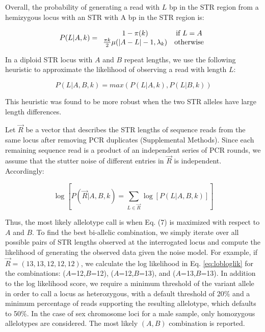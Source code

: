 {Overall, the probability of generating a read with $L$ bp in the STR region from a hemizygous locus with an STR with A bp in the STR region is:

\begin{equation}
P(L|A, k) = 
\begin{array}{c c}
1-\pi(k) & \text{if } L=A \\
\frac{\pi{k}}{2} \mu(|A-L|-1, \lambda_k) & \text{otherwise} \\
\end{array}
\end{equation}

In a diploid STR locus with $A$ and $B$ repeat lengths, we use the following heuristic to approximate the likelihood of observing a read with length $L$:

\begin{equation}
P(L|A,B,k) = max(P(L|A,k),P(L|B,k))
\end{equation}

This heuristic was found to be more robust when the two STR alleles have large length differences.

Let $\vec{R}$ be a vector that describes the STR lengths of sequence reads from the same locus after removing PCR duplicates (Supplemental Methods). Since each remaining sequence read is a product of an independent series of PCR rounds, we assume that the stutter noise of different entries in $\vec{R}$ is independent. Accordingly: 

\begin{equation} \label{eq:lobloglik}
\log[P(\vec{R}|A,B,k) = \sum_{L\in \vec{R}}\log[P(L|A,B,k)]]
\end{equation}

Thus, the most likely allelotype call is when Eq. (7) is maximized with respect to $A$ and $B$. To find the best bi-allelic combination, we simply iterate over all possible pairs of STR lengths observed at the interrogated locus and compute the likelihood of generating the observed data given the noise model. For example, if $\vec{R}=(13,13,12,12,12)$, we calculate the log likelihood in Eq. \ref{eq:lobloglik} for the combinations: ($A$=12,$B$=12), ($A$=12,$B$=13), and ($A$=13,$B$=13). In addition to the log likelihood score, we require a minimum threshold of the variant allele in order to call a locus as heterozygous, with a default threshold of 20\% and a minimum percentage of reads supporting the resulting allelotype, which defaults to 50\%. In the case of sex chromosome loci for a male sample, only homozygous allelotypes are considered. The most likely $(A,B)$ combination is reported.

}
